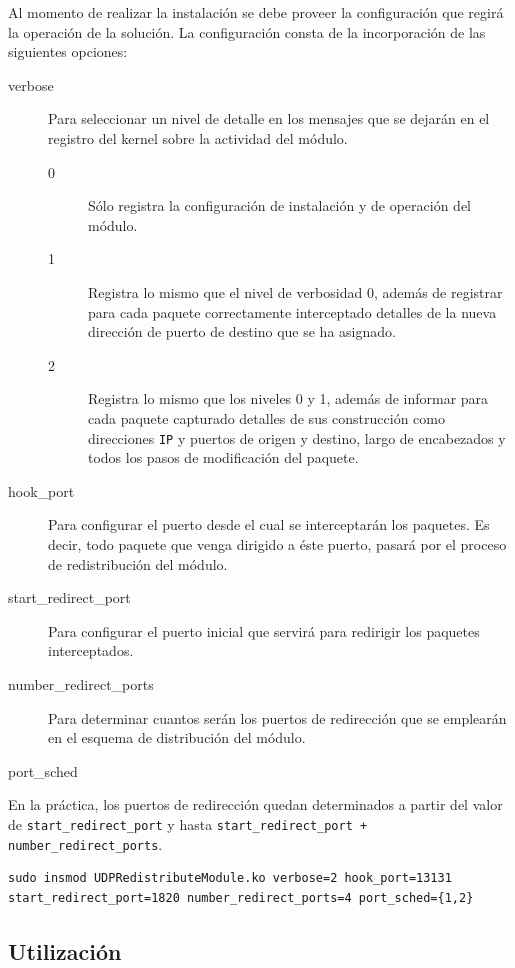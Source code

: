 Al momento de realizar la instalación se debe proveer la configuración que regirá la operación de la solución. La configuración consta de la incorporación de las siguientes opciones:

\begin{description}
\item[verbose] Para seleccionar un nivel de detalle en los mensajes que se dejarán en el registro del kernel sobre la actividad del módulo.
\begin{description}
\item[0] Sólo registra la configuración de instalación y de operación del módulo.
\item[1] Registra lo mismo que el nivel de verbosidad 0, además de registrar para cada paquete correctamente interceptado detalles de la nueva dirección de puerto de destino que se ha asignado.
\item[2] Registra lo mismo que los niveles 0 y 1, además de informar para cada paquete capturado detalles de sus construcción como direcciones \verb=IP= y puertos de origen y destino, largo de encabezados y todos los pasos de modificación del paquete.
\end{description}
\item[hook\_port] Para configurar el puerto desde el cual se interceptarán los paquetes. Es decir, todo paquete que venga dirigido a éste puerto, pasará por el proceso de redistribución del módulo.
\item[start\_redirect\_port] Para configurar el puerto inicial que servirá para redirigir los paquetes interceptados.
\item[number\_redirect\_ports] Para determinar cuantos serán los puertos de redirección que se emplearán en el esquema de distribución del módulo.
\item[port\_sched] 
\end{description}

En la práctica, los puertos de redirección quedan determinados a partir del valor de \verb=start_redirect_port= y hasta \verb=start_redirect_port + number_redirect_ports=.

\begin{lstlisting}[caption=ESO3]
sudo insmod UDPRedistributeModule.ko verbose=2 hook_port=13131 start_redirect_port=1820 number_redirect_ports=4 port_sched={1,2}
\end{lstlisting}

\subsection{Utilización}

